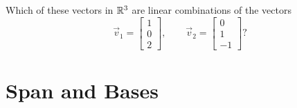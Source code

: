 \documentclass{ximera}
\begin{document}
\begin{example}
    Which of these vectors in $\mathbb{R}^3$ are linear combinations of the vectors
    \[
        \vec{v}_1 = \begin{bmatrix} 1 \\ 0 \\ 2 \end{bmatrix}, \qquad \vec{v}_2 = \begin{bmatrix} 0 \\ 1 \\ -1 \end{bmatrix}?
    \]

    \begin{selectAll}
    \end{selectAll}
\end{example}

\section*{Span and Bases}
\end{document}
